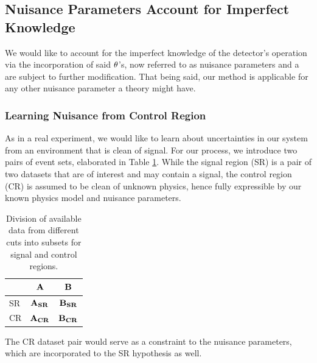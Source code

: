 \documentclass[../../ddppaper2.tex]{subfiles}
\begin{document}
\subsection{Nuisance Parameters Account for Imperfect Knowledge}

We would like to account for the imperfect knowledge of the detector's operation via the incorporation of said ${\theta}$'s, now referred to as nuisance parameters and a are subject to further modification. That being said, our method is applicable for any other nuisance parameter a theory might have.

\subsubsection{Learning Nuisance from Control Region}

As in a real experiment, we would like to learn about uncertainties in our system from an environment that is clean of signal. For our process, we introduce two pairs of event sets, elaborated in Table \ref{table:division_of_data}.
While the signal region (SR) is a pair of two datasets that are of interest and may contain a signal, the control region (CR) is assumed to be clean of unknown physics, hence fully expressible by our known physics model and nuisance parameters.

\begin{table}[ht]%
\centering
\caption{\label{table:division_of_data}}
\begin{ruledtabular}
\begin{tabular}{| l | c | c |}
 & ${\mathbf{A}}$ & ${\mathbf{B}}$ \\
\hline
SR & ${\mathbf{A_{SR}}}$ & ${\mathbf{B_{SR}}}$ \\
CR & ${\mathbf{A_{CR}}}$ & ${\mathbf{B_{CR}}}$ \\
\end{tabular}
\end{ruledtabular}
\caption{Division of available data from different cuts into subsets for signal and control regions.}
\end{table}

The CR dataset pair would serve as a constraint to the nuisance parameters, which are incorporated to the SR hypothesis as well.
\end{document}
